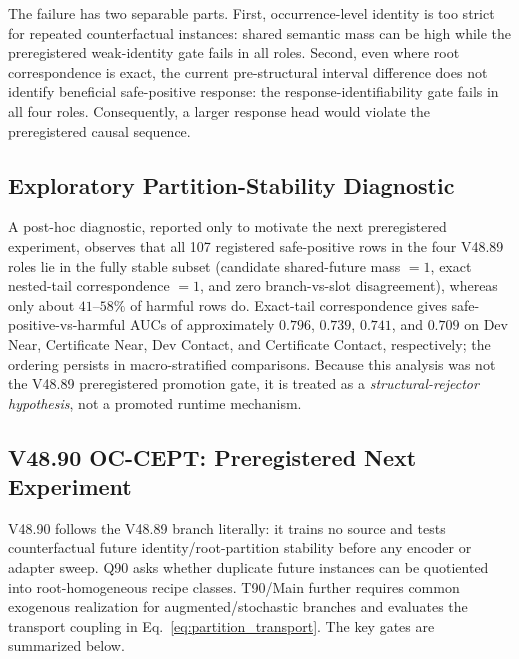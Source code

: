 \documentclass[conference]{IEEEtran}
\begin{document}
The failure has two separable parts. First, occurrence-level identity is too strict for repeated counterfactual instances: shared semantic mass can be high while the preregistered weak-identity gate fails in all roles. Second, even where root correspondence is exact, the current pre-structural interval difference does not identify beneficial safe-positive response: the response-identifiability gate fails in all four roles. Consequently, a larger response head would violate the preregistered causal sequence.

\subsection{Exploratory Partition-Stability Diagnostic}
A post-hoc diagnostic, reported only to motivate the next preregistered experiment, observes that all 107 registered safe-positive rows in the four V48.89 roles lie in the fully stable subset (candidate shared-future mass $=1$, exact nested-tail correspondence $=1$, and zero branch-vs-slot disagreement), whereas only about $41$--$58\%$ of harmful rows do. Exact-tail correspondence gives safe-positive-vs-harmful AUCs of approximately $0.796$, $0.739$, $0.741$, and $0.709$ on Dev Near, Certificate Near, Dev Contact, and Certificate Contact, respectively; the ordering persists in macro-stratified comparisons. Because this analysis was not the V48.89 preregistered promotion gate, it is treated as a \emph{structural-rejector hypothesis}, not a promoted runtime mechanism.

\subsection{V48.90 OC-CEPT: Preregistered Next Experiment}
V48.90 follows the V48.89 branch literally: it trains no source and tests counterfactual future identity/root-partition stability before any encoder or adapter sweep. Q90 asks whether duplicate future instances can be quotiented into root-homogeneous recipe classes. T90/Main further requires common exogenous realization for augmented/stochastic branches and evaluates the transport coupling in Eq.~\eqref{eq:partition_transport}. The key gates are summarized below.
\end{document}
